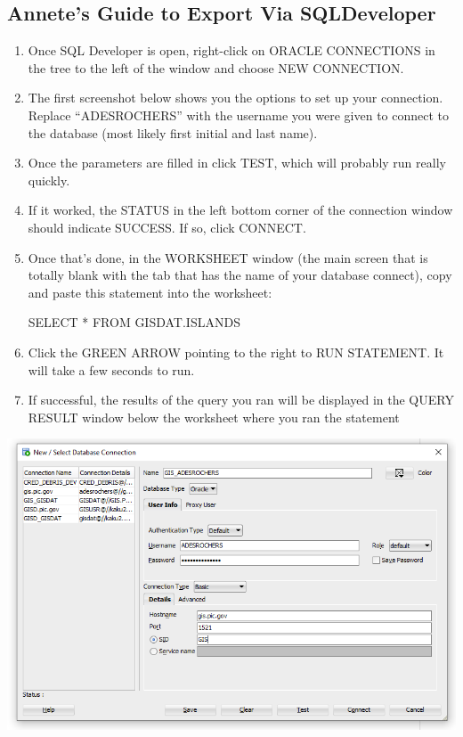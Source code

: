 \documentclass[
]{book}
\begin{document}
\hypertarget{annetes-guide-to-export-via-sqldeveloper}{%
\subsection{Annete's Guide to Export Via SQLDeveloper}\label{annetes-guide-to-export-via-sqldeveloper}}

\begin{enumerate}
\def\labelenumi{\arabic{enumi}.}
\item
  Once SQL Developer is open, right-click on ORACLE CONNECTIONS in the tree to the left of the window and choose NEW CONNECTION.
\item
  The first screenshot below shows you the options to set up your connection. Replace ``ADESROCHERS'' with the username you were given to connect to the database (most likely first initial and last name).
\item
  Once the parameters are filled in click TEST, which will probably run really quickly.
\item
  If it worked, the STATUS in the left bottom corner of the connection window should indicate SUCCESS. If so, click CONNECT.
\item
  Once that's done, in the WORKSHEET window (the main screen that is totally blank with the tab that has the name of your database connect), copy and paste this statement into the worksheet:

  SELECT * FROM GISDAT.ISLANDS
\item
  Click the GREEN ARROW pointing to the right to RUN STATEMENT. It will take a few seconds to run.
\item
  If successful, the results of the query you ran will be displayed in the QUERY RESULT window below the worksheet where you ran the statement
\end{enumerate}

\includegraphics[width=11.08in]{images/SQLDeveloper_Connect_April_2020_1}
\end{document}
